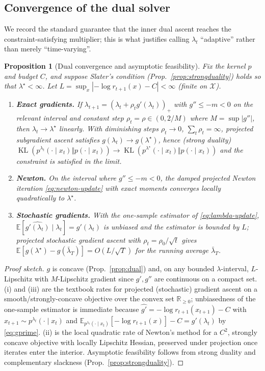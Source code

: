 \documentclass{article}
\newtheorem{proposition}{Proposition}
\DeclareMathOperator{\KL}{KL}
\newcommand{\E}{\mathbb{E}}
\newcommand{\R}{\mathbb{R}}
\newcommand{\X}{\mathcal{X}}
\newcommand{\lstar}{\lambda^{\star}}
\begin{document}
\subsection{Convergence of the dual solver}
We record the standard guarantee that the inner dual ascent reaches the constraint-satisfying multiplier; this is what justifies calling $\lambda_t$ ``adaptive'' rather than merely ``time-varying''.

\begin{proposition}[Dual convergence and asymptotic feasibility]
\label{prop:converge}
Fix the kernel $p$ and budget $C$, and suppose Slater's condition (Prop.~\ref{prop:strongduality}) holds so that $\lstar<\infty$. Let $L=\sup_x|{-}\log r_{t+1}(x)-C|<\infty$ (finite on $\X$).
\begin{enumerate}
\item[(i)] \textbf{Exact gradients.} If $\lambda_{t+1}=(\lambda_t+\rho_t g'(\lambda_t))_+$ with $g''\le-m<0$ on the relevant interval and constant step $\rho_t=\rho\in(0,2/M)$ where $M=\sup|g''|$, then $\lambda_t\to\lstar$ linearly. With diminishing steps $\rho_t\to0$, $\sum_t\rho_t=\infty$, projected subgradient ascent satisfies $g(\lambda_t)\to g(\lstar)$, hence (strong duality) $\KL(p^{\lambda_t}(\cdot\mid x_t)\Vert p(\cdot\mid x_t))\to\KL(p^{\lstar}(\cdot\mid x_t)\Vert p(\cdot\mid x_t))$ and the constraint is satisfied in the limit.
\item[(ii)] \textbf{Newton.} On the interval where $g''\le -m<0$, the damped projected Newton iteration \eqref{eq:newton-update} with exact moments converges locally quadratically to $\lstar$.
\item[(iii)] \textbf{Stochastic gradients.} With the one-sample estimator of \eqref{eq:lambda-update}, $\E[\widehat{g'(\lambda_t)}\mid\lambda_t]=g'(\lambda_t)$ is unbiased and the estimator is bounded by $L$; projected stochastic gradient ascent with $\rho_t=\rho_0/\sqrt{t}$ gives $\E[g(\lstar)-g(\bar\lambda_T)]=O(L/\sqrt{T})$ for the running average $\bar\lambda_T$.
\end{enumerate}
\end{proposition}
\begin{proof}[Proof sketch]
$g$ is concave (Prop.~\ref{prop:dual}) and, on any bounded $\lambda$-interval, $L$-Lipschitz with $M$-Lipschitz gradient since $g',g''$ are continuous on a compact set. (i) and (iii) are the textbook rates for projected (stochastic) gradient ascent on a smooth/strongly-concave objective over the convex set $\R_{\ge0}$; unbiasedness of the one-sample estimator is immediate because $\widehat{g'}=-\log r_{t+1}(x_{t+1})-C$ with $x_{t+1}\sim p^{\lambda_t}(\cdot\mid x_t)$ and $\E_{p^{\lambda_t}(\cdot\mid x_t)}[-\log r_{t+1}(x)]-C=g'(\lambda_t)$ by \eqref{eq:gprime}. (ii) is the local quadratic rate of Newton's method for a $C^2$, strongly concave objective with locally Lipschitz Hessian, preserved under projection once iterates enter the interior. Asymptotic feasibility follows from strong duality and complementary slackness (Prop.~\ref{prop:strongduality}).
\end{proof}
\end{document}

